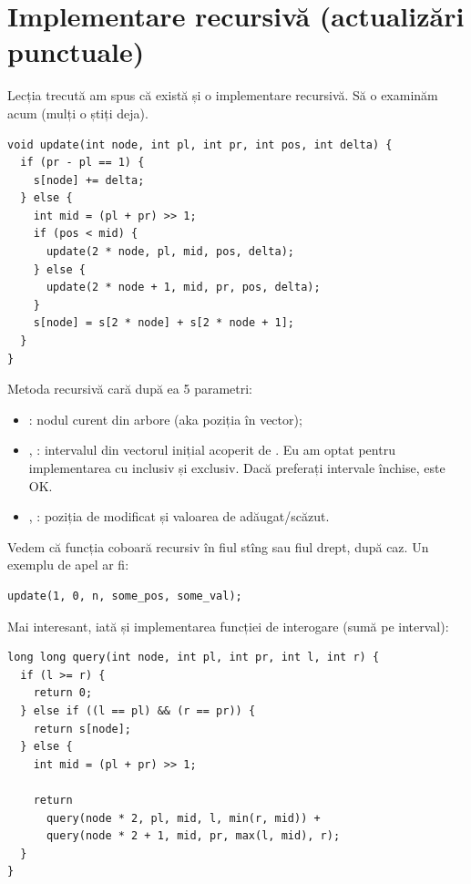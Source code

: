 \documentclass[../main.tex]{subfiles}
\begin{document}
\section{Implementare recursivă (actualizări punctuale)}

Lecția trecută am spus că există și o implementare recursivă. Să o examinăm acum (mulți o știți deja).

\begin{verbatim}
void update(int node, int pl, int pr, int pos, int delta) {
  if (pr - pl == 1) {
    s[node] += delta;
  } else {
    int mid = (pl + pr) >> 1;
    if (pos < mid) {
      update(2 * node, pl, mid, pos, delta);
    } else {
      update(2 * node + 1, mid, pr, pos, delta);
    }
    s[node] = s[2 * node] + s[2 * node + 1];
  }
}
\end{verbatim}

Metoda recursivă cară după ea 5 parametri:

\begin{itemize}
  \item {}: nodul curent din arbore (aka poziția în vector);

  \item {}, : intervalul din vectorul inițial acoperit de . Eu am optat pentru implementarea cu  inclusiv și  exclusiv. Dacă preferați intervale închise, este OK.

  \item {}, : poziția de modificat și valoarea de adăugat/scăzut.
\end{itemize}

Vedem că funcția coboară recursiv în fiul stîng sau fiul drept, după caz. Un exemplu de apel ar fi:

\begin{verbatim}
update(1, 0, n, some_pos, some_val);
\end{verbatim}

Mai interesant, iată și implementarea funcției de interogare (sumă pe interval):

\begin{verbatim}
long long query(int node, int pl, int pr, int l, int r) {
  if (l >= r) {
    return 0;
  } else if ((l == pl) && (r == pr)) {
    return s[node];
  } else {
    int mid = (pl + pr) >> 1;

    return
      query(node * 2, pl, mid, l, min(r, mid)) +
      query(node * 2 + 1, mid, pr, max(l, mid), r);
  }
}
\end{verbatim}
\end{document}
